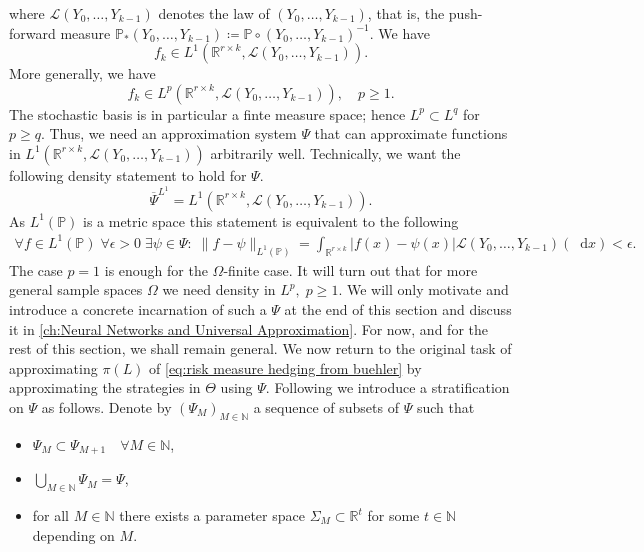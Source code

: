 \documentclass[11pt,a4paper,twoside,openany]{report}
\newcommand{\diff}{\mathop{}\!\mathrm{d}}
\theoremstyle{plain} %
\theoremstyle{definition} %
\theoremstyle{remark} %
\let\parencite\authnumparencite
\begin{document}
where \(\mathcal{L}(Y_0,\dots,Y_{k-1})\) denotes the law of \((Y_0,\dots,Y_{k-1})\), that is, the push-forward measure \(\mathbb{P}_*(Y_0,\dots,Y_{k-1})\coloneqq\mathbb{P}\circ(Y_0,\dots,Y_{k-1})^{-1}\). We have 
\begin{equation}\label{eq:f is in L1 for finite Omega}
    f_k\in L^1(\mathbb{R}^{r\times k},\mathcal{L}(Y_0,\dots,Y_{k-1})).
\end{equation}
More generally, we have
\begin{equation}
    f_k\in L^p(\mathbb{R}^{r\times k},\mathcal{L}(Y_0,\dots,Y_{k-1})),\quad p\geq 1.
\end{equation}
The stochastic basis is in particular a finte measure space; hence \(L^p\subset L^q\) for \(p\geq q\). Thus, we need an approximation system \(\Psi\) that can approximate functions in \(L^1(\mathbb{R}^{r\times k},\mathcal{L}(Y_0,\dots,Y_{k-1}))\) arbitrarily well. Technically, we want the following density statement to hold for \(\Psi\).
\begin{equation}
\overline{\Psi}^{L^1}=L^1(\mathbb{R}^{r\times k},\mathcal{L}(Y_0,\dots,Y_{k-1})).
\end{equation}
As \(L^1(\mathbb{P})\) is a metric space this statement is equivalent to the following
\begin{align*}
\forall f\in L^1(\mathbb{P})\;\forall \epsilon>0\;\exists \psi\in\Psi:\;\lVert f-\psi\rVert_{L^1(\mathbb{P})}=\int_{\mathbb{R}^{r\times k}}|f(x)-\psi(x)| \mathcal{L}(Y_0,\dots,Y_{k-1})(\diff x)<\epsilon.
\end{align*}
The case \(p=1\) is enough for the \(\Omega\)-finite case. It will turn out that for more general sample spaces \(\Omega\) we need density in \(L^p,\; p\geq 1\).
We will only motivate and introduce a concrete incarnation of such a \(\Psi\) at the end of this section and discuss it in \cref{ch:Neural Networks and Universal Approximation}. For now, and for the rest of this section, we shall remain general.
\bigbreak
We now return to the original task of approximating \(\pi(L)\) of \cref{eq:risk measure hedging from buehler} by approximating the strategies in \(\Theta\) using \(\Psi\). Following \parencite{Buehler2018DeepHedging}  we introduce a stratification on \(\Psi\) as follows. Denote by \((\Psi_M)_{M\in\mathbb{N}}\) a sequence of subsets of \(\Psi\) such that 
\begin{itemize}
    \item \(\Psi_M\subset\Psi_{M+1}\quad\forall M\in\mathbb{N}\),
    \item \(\bigcup_{M\in\mathbb{N}}\Psi_M=\Psi\),
    \item for all \(M\in\mathbb{N}\) there exists a parameter space \(\Sigma_M\subset\mathbb{R}^t\) for some \(t\in\mathbb{N}\) depending on \(M\).
\end{itemize}
\end{document}
